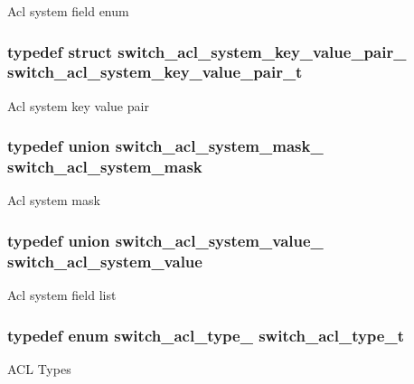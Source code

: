 Acl system field enum \hypertarget{group__ACL_gacb401e5568e083878e6b2681fa8fbcc7}{
\subsubsection[{switch\+\_\+acl\+\_\+system\+\_\+key\+\_\+value\+\_\+pair\+\_\+t}]{\setlength{\rightskip}{0pt plus 5cm}typedef struct {\bf switch\+\_\+acl\+\_\+system\+\_\+key\+\_\+value\+\_\+pair\+\_\+}  {\bf switch\+\_\+acl\+\_\+system\+\_\+key\+\_\+value\+\_\+pair\+\_\+t}}}\label{group__ACL_gacb401e5568e083878e6b2681fa8fbcc7}
Acl system key value pair \hypertarget{group__ACL_ga2477a68d4720b67cc14276c172e2a018}{
\subsubsection[{switch\+\_\+acl\+\_\+system\+\_\+mask}]{\setlength{\rightskip}{0pt plus 5cm}typedef union {\bf switch\+\_\+acl\+\_\+system\+\_\+mask\+\_\+}  {\bf switch\+\_\+acl\+\_\+system\+\_\+mask}}}\label{group__ACL_ga2477a68d4720b67cc14276c172e2a018}
Acl system mask \hypertarget{group__ACL_gaee5058c582d2ac1022152bef17c061ea}{
\subsubsection[{switch\+\_\+acl\+\_\+system\+\_\+value}]{\setlength{\rightskip}{0pt plus 5cm}typedef union {\bf switch\+\_\+acl\+\_\+system\+\_\+value\+\_\+}  {\bf switch\+\_\+acl\+\_\+system\+\_\+value}}}\label{group__ACL_gaee5058c582d2ac1022152bef17c061ea}
Acl system field list \hypertarget{group__ACL_ga01c3d85a9624b16e65bc9272f210e961}{
\subsubsection[{switch\+\_\+acl\+\_\+type\+\_\+t}]{\setlength{\rightskip}{0pt plus 5cm}typedef enum {\bf switch\+\_\+acl\+\_\+type\+\_\+}  {\bf switch\+\_\+acl\+\_\+type\+\_\+t}}}\label{group__ACL_ga01c3d85a9624b16e65bc9272f210e961}
A\+C\+L Types 

